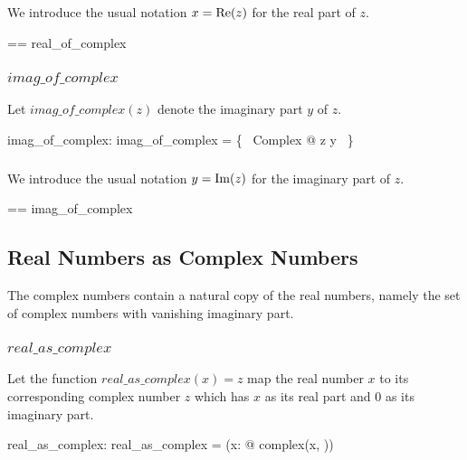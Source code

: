 \documentclass{amsart}
\begin{document}
\subsubsection{}

We introduce the usual notation $x = \operatorname{Re}(z)$ for the real part of $z$.

\begin{zed}
	\realC == real\_of\_complex
\end{zed}

\subsubsection{$imag\_of\_complex$}

Let $imag\_of\_complex(z)$ denote the imaginary part $y$ of $z$.

\begin{axdef}
	imag\_of\_complex: \C \fun \R
\where
	imag\_of\_complex = \{~ Complex @ z \mapsto y ~\}
\end{axdef}

\subsubsection{}

We introduce the usual notation $y = \operatorname{Im}(z)$ for the imaginary part of $z$.

\begin{zed}
	\imagC == imag\_of\_complex
\end{zed}

\subsection{Real Numbers as Complex Numbers}

The complex numbers contain a natural copy of the real numbers,
namely the set of complex numbers with vanishing imaginary part.

\subsubsection{$real\_as\_complex$}

Let the function $real\_as\_complex(x) = z$ map the real number $x$
to its corresponding complex number $z$ which has $x$ as its real part and $0$ as its imaginary part.

\begin{axdef}
	real\_as\_complex: \R \fun \C
\where
	real\_as\_complex = (\lambda x: \R @ complex(x, \zeroR))
\end{axdef}
\end{document}
